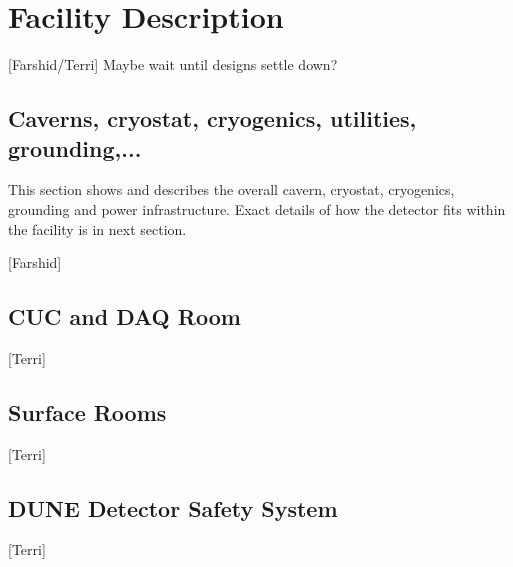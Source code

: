 \chapter{Facility Description}
\label{vl:tc-facility}

[Farshid/Terri] Maybe wait until designs settle down?

\section{Caverns, cryostat, cryogenics, utilities, grounding,...}

This section shows and describes the overall cavern, cryostat,
cryogenics, grounding and power infrastructure. Exact details of how
the detector fits within the facility is in next section.

[Farshid]

\section{CUC and DAQ Room}

[Terri]

\section{Surface Rooms}

[Terri]

\section{DUNE Detector Safety System}

[Terri]

